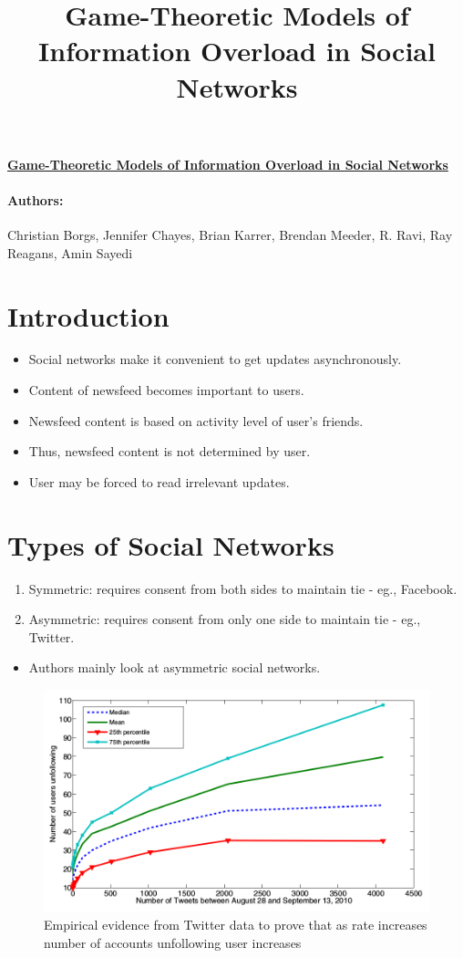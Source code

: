 \documentclass[8pt]{article}
\title{Game-Theoretic Models of Information Overload in Social Networks}
\newcommand{\bi}{\begin{itemize}}
\newcommand{\ei}{\end{itemize}}
\newcommand{\bn}{\begin{enumerate}}
\newcommand{\en}{\end{enumerate}}
\begin{document}
\centerline{\underline{\textbf{Game-Theoretic Models of Information Overload in Social
        Networks}}}
\paragraph{Authors: } Christian Borgs, Jennifer Chayes, Brian Karrer, Brendan Meeder, R.
Ravi, Ray Reagans, Amin Sayedi

\section{Introduction}
\bi \item Social networks make it convenient to get updates asynchronously.
\item Content of newsfeed becomes important to users.
\item Newsfeed content is based on activity level of user's friends.
\item Thus, newsfeed content is not determined by user.
\item User may be forced to read irrelevant updates.
\ei

\section{Types of Social Networks}
\bn
\item Symmetric: requires consent from both sides to maintain tie - eg.,
    Facebook.
\item Asymmetric: requires consent from only one side to maintain tie - eg.,
    Twitter.
\en
\bi
\item Authors mainly look at asymmetric social networks.
\ei

\begin{figure}[ht]
    \label{empirical_evidence}
    \includegraphics[scale=0.2]{./figures/twitter_data.png}
    \caption{Empirical evidence from Twitter data to prove that as rate
        increases number of accounts unfollowing user increases}
\end{figure}
\end{document}
